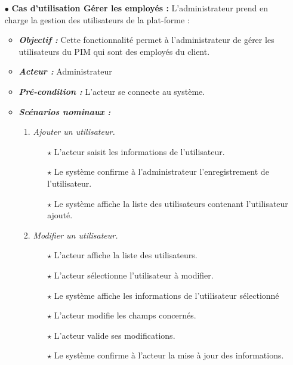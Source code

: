 \begin{itemize}
\bigskip

\item[$\bullet$] \textbf{Cas d’utilisation Gérer les employés :} L’administrateur prend en charge la gestion des utilisateurs de la plat-forme :
\medskip
    \begin{itemize}
    \item \textit{\textbf{Objectif :}}  Cette fonctionnalité permet à l’administrateur de gérer les utilisateurs du PIM qui sont des employés du client.

    \item \textit{\textbf{Acteur :}} Administrateur

    \item \textit{\textbf{Pré-condition  :}} L’acteur se connecte au système. 

    \item \textit{\textbf{Scénarios nominaux :}}
         \begin{enumerate}
             \item \textit{Ajouter un utilisateur.}
                    \begin{itemize}
                       \item[$\star$]  L’acteur saisit les informations de l’utilisateur. 
                       \item[$\star$] Le système confirme à l’administrateur l’enregistrement de l’utilisateur.
                       \item[$\star$] Le système affiche la liste des utilisateurs contenant l’utilisateur ajouté.
                    \end{itemize}
             \item \textit{Modifier un utilisateur.}
                    \begin{itemize}
                       \item[$\star$] L’acteur affiche la liste des utilisateurs. 
                       \item[$\star$] L’acteur sélectionne l’utilisateur à modifier. 
                       \item[$\star$] Le système affiche les informations de l’utilisateur sélectionné
                       \item[$\star$] L’acteur modifie les champs concernés. 
                       \item[$\star$] L’acteur valide ses modifications. 
                       \item[$\star$] Le système confirme à l’acteur la mise à jour des informations.

\end{itemize}
\end{enumerate}
\end{itemize}
\end{itemize}
